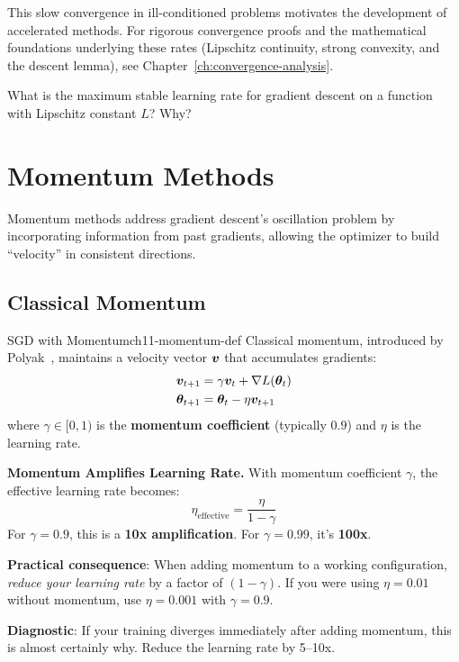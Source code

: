 \documentclass[../../main.tex]{subfiles}
\begin{document}
This slow convergence in ill-conditioned problems motivates the development of accelerated methods. For rigorous convergence proofs and the mathematical foundations underlying these rates (Lipschitz continuity, strong convexity, and the descent lemma), see Chapter~\ref{ch:convergence-analysis}.

\begin{checkpoint}
What is the maximum stable learning rate for gradient descent on a function with Lipschitz constant $L$? Why?
\end{checkpoint}

\section{Momentum Methods}
\label{sec:ch11-momentum}

Momentum methods address gradient descent's oscillation problem by incorporating information from past gradients, allowing the optimizer to build ``velocity'' in consistent directions.

\subsection{Classical Momentum}

\begin{definition}{SGD with Momentum}{ch11-momentum-def}
Classical momentum, introduced by Polyak~\cite{polyak1964some}, maintains a velocity vector $\boldsymbol{v}$ that accumulates gradients:
\begin{align}
    \boldsymbol{v}_{t+1} &= \gamma \boldsymbol{v}_t + \nabla L(\boldsymbol{\theta}_t) \\
    \boldsymbol{\theta}_{t+1} &= \boldsymbol{\theta}_t - \eta \boldsymbol{v}_{t+1}
\end{align}
where $\gamma \in [0, 1)$ is the \textbf{momentum coefficient} (typically $0.9$) and $\eta$ is the learning rate.
\end{definition}

\begin{important}
\textbf{Momentum Amplifies Learning Rate.} With momentum coefficient $\gamma$, the effective learning rate becomes:
\[
\eta_{\text{effective}} = \frac{\eta}{1 - \gamma}
\]
For $\gamma = 0.9$, this is a \textbf{10x amplification}. For $\gamma = 0.99$, it's \textbf{100x}.

\textbf{Practical consequence}: When adding momentum to a working configuration, \textit{reduce your learning rate} by a factor of $(1-\gamma)$. If you were using $\eta = 0.01$ without momentum, use $\eta = 0.001$ with $\gamma = 0.9$.

\textbf{Diagnostic}: If your training diverges immediately after adding momentum, this is almost certainly why. Reduce the learning rate by 5--10x.
\end{important}
\end{document}
